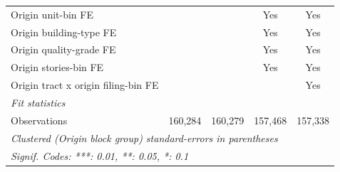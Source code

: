 \begin{tabular}{lcccc}
   Origin unit-bin FE                              &                &               & Yes             & Yes\\  
   Origin building-type FE                         &                &               & Yes             & Yes\\  
   Origin quality-grade FE                         &                &               & Yes             & Yes\\  
   Origin stories-bin FE                           &                &               & Yes             & Yes\\  
   Origin tract x origin filing-bin FE             &                &               &                 & Yes\\  
   \midrule
   \emph{Fit statistics}\\
   Observations                                    & 160,284        & 160,279       & 157,468         & 157,338\\  
   \midrule \midrule
   \multicolumn{5}{l}{\emph{Clustered (Origin block group) standard-errors in parentheses}}\\
   \multicolumn{5}{l}{\emph{Signif. Codes: ***: 0.01, **: 0.05, *: 0.1}}\\
\end{tabular}
\par\endgroup
